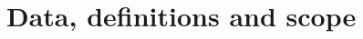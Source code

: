                                                                                                                                                                                                                                                                                                                                                                                                                                                                                                                        
\clearpage
\tableofcontents
\vfill
                                                                                                                                                                                                                                                                                                                                                                                                                               
\clearpage
\section{Data, definitions and scope}\label{sec:data}
                                                                                                                                                                                                                                                                                                                                                                                                                                                                                                                                       
                                                                                                                                                                                                                                                                                                                                                                                                                                                                                            
\begin{table}[H]\centering\small
\caption{                                                   }\label{tab:data}

\end{table}
                                                                                                                                                                                                                                                                                                                                                                                                                                         

